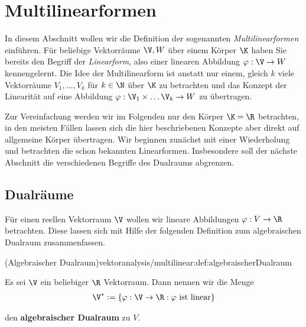 \documentclass[letterpaper,10pt,english]{jupyterBook}
\begin{document}
\section{Multilinearformen}
\label{\detokenize{vektoranalysis/multilinear:multilinearformen}}\label{\detokenize{vektoranalysis/multilinear:s-multilinearformen}}\label{\detokenize{vektoranalysis/multilinear::doc}}
\par
In diesem Abschnitt wollen wir die Definition der sogenannten \emph{Multilinearformen} einführen.
Für beliebige Vektorräume \(\V, W\) über einem Körper \(\K\) haben Sie bereits den Begriff der \emph{Linearform}, also einer linearen Abbildung \(\varphi:\V\rightarrow W\) kennengelernt.
Die Idee der Multilinearform ist anstatt nur einem, gleich \(k\) viele Vektorräume \(V_1,\ldots,V_k\) für \(k \in \N\) über \(\K\) zu betrachten und das Konzept der Linearität auf eine Abbildung \(\varphi:\V_1\times\ldots\V_k\rightarrow W\) zu übertragen.

\par
Zur Vereinfachung werden wir im Folgenden nur den Körper \(\K=\R\) betrachten, in den meisten Fällen lassen sich die hier beschriebenen Konzepte aber direkt auf allgemeine Körper übertragen.
Wir beginnen zunächst mit einer Wiederholung und betrachten die schon bekannten Linearformen.
Insbesondere soll der nächste Abschnitt die verschiedenen Begriffe des Dualraums abgrenzen.


\subsection{Dualräume}
\label{\detokenize{vektoranalysis/multilinear:dualraume}}
\par
Für einen reellen Vektorraum \(\V\) wollen wir lineare Abbildungen \(\varphi:V\to\R\) betrachten.
Diese lassen sich mit Hilfe der folgenden Definition zum algebraischen Dualraum zusammenfassen.
\begin{definition}{(Algebraischer Dualraum)}{vektoranalysis/multilinear:def:algebraischerDualraum}



\par
Es sei \(\V\) ein beliebiger \(\R\) Vektorraum.
Dann nennen wir die Menge
\begin{align*}
\V^\ast := \{\varphi:\V\rightarrow\R: \varphi\text{ ist linear}\}
\end{align*}
\par
den \textbf{algebraischer Dualraum} zu \(V\).
\end{definition}
\end{document}
